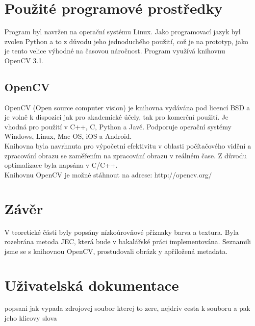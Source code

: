\documentclass{report}
\begin{document}
\chapter{Použité programové prostředky}
Program byl navržen na operační systému Linux. Jako programovací jazyk byl zvolen Python a to z důvodu jeho jednoduchého použití, což je na prototyp, jako je tento velice výhodné na časovou náročnost. Program využívá knihovnu OpenCV 3.1. 
  
\section{OpenCV}
OpenCV (Open source computer vision) je knihovna vydávána pod licencí BSD a je volně k dispozici jak pro akademické účely, tak pro komerční použití. Je vhodná pro použití v C++, C, Python a Javě. Podporuje operační systémy Windows, Linux, Mac OS, iOS a Android.
\\
Knihovna byla navrhnuta pro výpočetní efektivitu v oblasti počítačového vidění a zpracování obrazu se zaměřením na zpracování obrazu v reálném čase. Z důvodu optimalizace byla napsána v C/C++. 
\\
Knihovnu OpenCV je možné stáhnout na adrese: http://opencv.org/

\chapter{Závěr}
V teoretické části byly popsány nízkoúrovňové příznaky barva a textura. Byla rozebrána metoda JEC, která bude v bakalářské práci implementována. Seznamili jsme se s knihovnou OpenCV, prostudovali obrázk y apříložená metadata.

\chapter{Uživatelská dokumentace}
popsani jak vypada zdrojovej soubor kterej to zere, nejdriv cesta k souboru a pak jeho klicovy slova
\end{document}
